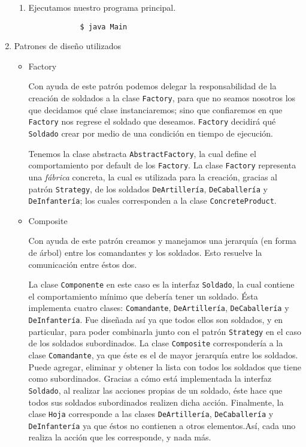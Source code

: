 \documentclass[letterpaper,11pt]{article}
\begin{document}
\begin{enumerate}
\begin{enumerate}
        \item Ejecutamos nuestro programa principal.
        \begin{verbatim}
            $ java Main 
        \end{verbatim}
    \end{enumerate}

    \newpage
    \item Patrones de diseño utilizados
    \begin{itemize}
        \item Factory

        Con ayuda de este patrón podemos delegar la responsabilidad de la 
        creación de soldados a la clase \texttt{Factory}, para que no seamos 
        nosotros los que decidamos qué clase instanciaremos; sino que 
        confiaremos en que \texttt{Factory} nos regrese el soldado que deseamos.
        \texttt{Factory} decidirá qué \texttt{Soldado} crear por medio de una 
        condición en tiempo de ejecución.

        Tenemos la clase abstracta \texttt{AbstractFactory}, la cual define el 
        comportamiento por default de los \texttt{Factory}. La clase 
        \texttt{Factory} representa una \textit{fábrica} concreta, la cual es 
        utilizada para la creación, gracias al patrón \texttt{Strategy}, de los 
        soldados \texttt{DeArtillería}, \texttt{DeCaballería} y 
        \texttt{DeInfantería}; los cuales corresponden a la clase 
        \texttt{ConcreteProduct}. 

        \item Composite

        Con ayuda de este patrón creamos y manejamos una jerarquía (en forma 
        de árbol) entre los comandantes y los soldados. Esto resuelve la 
        comunicación entre éstos dos. 

        La clase \texttt{Componente} en este caso es la interfaz 
        \texttt{Soldado}, la cual contiene el comportamiento mínimo que debería 
        tener un soldado. Ésta implementa cuatro clases: \texttt{Comandante}, 
        \texttt{DeArtillería}, \texttt{DeCaballería} y \texttt{DeInfantería}. 
        Fue diseñada así ya que todos ellos son soldados, y en particular, para 
        poder combinarla junto con el patrón \texttt{Strategy} en el caso de 
        los soldados subordinados. La clase \texttt{Composite} correspondería a 
        la clase \texttt{Comandante}, ya que éste es el de mayor jerarquía entre 
        los soldados. Puede agregar, eliminar y obtener la lista con todos los 
        soldados que tiene como subordinados. Gracias a cómo está implementada
        la interfaz \texttt{Soldado}, al realizar las acciones propias de un 
        soldado, éste hace que todos sus soldados subordinados realizen dicha 
        acción. Finalmente, la clase \texttt{Hoja} corresponde a las clases 
        \texttt{DeArtillería}, \texttt{DeCaballería} y \texttt{DeInfantería}
        ya que éstos no contienen a otros elementos.Así, cada uno realiza 
        la acción que les corresponde, y nada más.


\end{itemize}
\end{enumerate}
\end{document}
